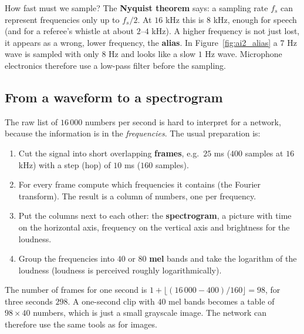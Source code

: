 How fast must we sample? The \textbf{Nyquist theorem} says: a sampling rate $f_s$ can represent frequencies only up to $f_s/2$. At $16$ kHz this is $8$ kHz, enough for speech (and for a referee's whistle at about $2$--$4$ kHz). A higher frequency is not just lost, it appears as a wrong, lower frequency, the \textbf{alias}. In Figure~\ref{fig:ai2_alias} a $7$ Hz wave is sampled with only $8$ Hz and looks like a slow $1$ Hz wave. Microphone electronics therefore use a low-pass filter before the sampling.

\begin{center}
\label{fig:ai2_alias}
\end{center}

\subsection*{From a waveform to a spectrogram}
The raw list of $16\,000$ numbers per second is hard to interpret for a network, because the information is in the \emph{frequencies}. The usual preparation is:
\begin{enumerate}[nosep]
  \item Cut the signal into short overlapping \textbf{frames}, e.g.\ $25$ ms ($400$ samples at $16$ kHz) with a step (hop) of $10$ ms ($160$ samples).
  \item For every frame compute which frequencies it contains (the Fourier transform). The result is a column of numbers, one per frequency.
  \item Put the columns next to each other: the \textbf{spectrogram}, a picture with time on the horizontal axis, frequency on the vertical axis and brightness for the loudness.
  \item Group the frequencies into $40$ or $80$ \textbf{mel} bands and take the logarithm of the loudness (loudness is perceived roughly logarithmically).
\end{enumerate}
The number of frames for one second is $1+\lfloor(16\,000-400)/160\rfloor=98$, for three seconds $298$. A one-second clip with $40$ mel bands becomes a table of $98\times40$ numbers, which is just a small grayscale image. The network can therefore use the same tools as for images.

